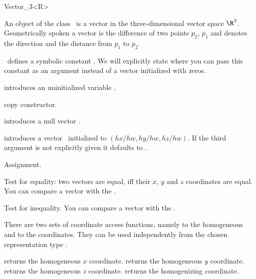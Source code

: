 \begin{ccRefClass} {Vector_3<R>}

\ccDefinition

An object of the class \ccRefName\ is a vector in the three-dimensional 
vector space $\R^3$. Geometrically spoken a vector is the difference
of two points $p_2$, $p_1$ and denotes the direction and the distance
from   $p_1$ to $p_2$. 

\cgal\ defines a symbolic constant . We 
will explicitly state where you can pass this constant as an argument
instead of a vector initialized with zeros.


\ccCreation
{}


\ccHidden{}
             {introduces an uninitialized variable \ccVar.}

\ccHidden {}
 	    {copy constructor.}

 	    {introduces a null vector \ccVar.}

            {introduces a vector \ccVar\ initialized to $(hx/hw, hy/hw, hz/hw)$.
             If the third argument is not explicitly given it defaults
             to .}


\ccOperations

\ccHidden {}
        {Assignment.}

       {Test for equality: two vectors are equal, iff their $x$, $y$ 
        and $z$ coordinates are equal. You can compare a vector with the
        .}

       {Test for inequality. You can compare a vector with the
        .}


There are two sets of coordinate access functions, namely to the
homogeneous and to the  coordinates. They can be used
independently from the chosen representation type .

       {returns the homogeneous $x$ coordinate.}
\ccGlue
{}
       {returns the homogeneous $y$ coordinate.}
\ccGlue
{}
       {returns the homogeneous $z$ coordinate.}
\ccGlue
{}
       {returns the homogenizing  coordinate.}


\end{ccRefClass}
